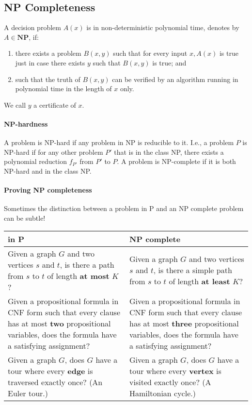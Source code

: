 \subsection{NP Completeness}
A decision problem \(A(x)\) is in non-deterministic polynomial time, denotes by \(A\in\textbf{NP}\), if:
\begin{enumerate}
    \item there exists a problem \(B(x,y)\) such that for every input \(x, A(x)\) is true just in case there exists \(y\) such that \(B(x,y)\) is true; and
    \item such that the truth of \(B(x,y)\) can be verified by an algorithm running in polynomial time in the length of \(x\) only.
\end{enumerate}
We call \(y\) a certificate of \(x\).

\paragraph{NP-hardness}
A problem is NP-hard if any problem in NP is reducible to it. I.e., a problem \(P\) is NP-hard if for any other problem \(P'\) that is in the class NP, there exists a polynomial reduction \(f_{P'}\) from \(P'\) to \(P\). A problem is NP-complete if it is both NP-hard and in the class NP. 
\paragraph{Proving NP completeness} 
Sometimes the distinction between a problem in P and an NP complete problem can be subtle!

\begin{tabularx}{0.9\textwidth} { 
  | >{\raggedright\arraybackslash}X 
  | >{\raggedright\arraybackslash}X | }
 \hline
 \textbf{in P} & \textbf{NP complete} \\
 \hline
Given a graph \(G\) and two vertices \(s\) and \(t\), is there a path from \(s\) to \(t\) of length \textbf{at most} \(K\)?  & Given a graph \(G\) and two vertices \(s\) and \(t\), is there a simple path from \(s\) to \(t\) of length \textbf{at least} \(K\)?  \\
\hline
Given a propositional formula in CNF form such that every clause has at most \textbf{two} propositional variables, does the formula have a satisfying assignment? & Given a propositional formula in CNF form such that every clause has at most \textbf{three} propositional variables, does the formula have a satisfying assignment? \\
\hline 
Given a graph \(G\), does \(G\) have a tour where every \textbf{edge} is traversed exactly once? (An Euler tour.) & Given a graph \(G\), does \(G\) have a tour where every \textbf{vertex} is visited exactly once? (A Hamiltonian cycle.) \\
\hline
\end{tabularx}


